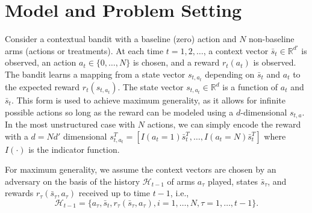 \documentclass{article}
\begin{document}
\section{Model and Problem Setting}




Consider a contextual bandit with a baseline (zero) action and $N$ non-baseline arms (actions or treatments). At each time $t = 1,2, \dots$, a context vector $\bar{s}_t \in \mathbb{R}^{d'}$ is observed, an action $a_t \in \{0, \dots, N\}$ is chosen, and a reward $r_t(a_t)$ is observed. The bandit learns a mapping from a state vector $s_{t,a_t}$ depending on $\bar{s}_t$ and $a_t$ to the expected reward $r_t(s_{t,a_t})$. 
The state vector $s_{t,a_t} \in \mathbb{R}^d$ is a function of $a_t$ and $\bar{s}_t$. This form is used to achieve maximum generality, as it allows for infinite possible actions so long as the reward can be modeled using a $d$-dimensional $s_{t,a}$. In the most unstructured case with $N$ actions, we can simply encode the reward with a $d = Nd'$ dimensional $s_{t,a_t}^T = [I(a_t = 1)\bar{s}_t^T, \dots, I(a_t = N) \bar{s}_t^T]$ where $I(\cdot)$ is the indicator function. 

For maximum generality, we assume the context vectors are chosen by an adversary on the basis of the history $\mathcal{H}_{t-1}$ of arms $a_\tau$ played, states $\bar{s}_\tau$, and rewards $ r_{\tau} (\bar{s}_\tau, a_\tau)$ received up to time $t-1$, i.e.,
\[
\mathcal{H}_{t-1} = \{a_\tau , \bar{s}_t, r_{\tau} (\bar{s}_\tau, a_\tau), i = 1,\dots, N, \tau = 1, \dots, t-1\}.
\]


\end{document}
